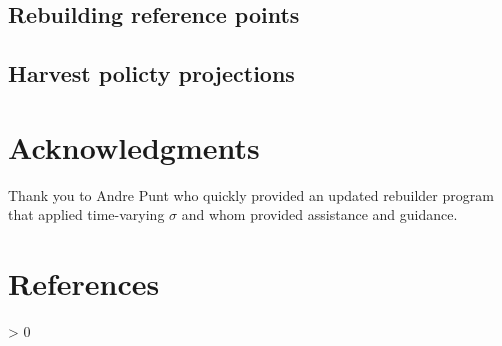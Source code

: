 \documentclass[11pt,
  english,
  a4paper,
]{article}
\newlength{\cslhangindent}
\newenvironment{CSLReferences}[2] %
 {%
  \setlength{\parindent}{0pt}
  \ifodd #1 \everypar{\setlength{\hangindent}{\cslhangindent}}\ignorespaces\fi
  \ifnum #2 > 0
  \setlength{\parskip}{#2\baselineskip}
  \fi
 }%
 {}
\begin{document}
\leavevmode\tagmcend\tagstructend


\hypertarget{rebuilding-reference-points}{%
\subsection{Rebuilding reference points}\label{rebuilding-reference-points}}

\leavevmode\tagmcend\tagstructend


\hypertarget{harvest-policty-projections}{%
\subsection{Harvest policty projections}\label{harvest-policty-projections}}

\leavevmode\tagmcend\tagstructend


\hypertarget{acknowledgments}{%
\section{Acknowledgments}\label{acknowledgments}}

\leavevmode\tagmcend\tagstructend


Thank you to Andre Punt who quickly provided an updated rebuilder program that applied time-varying {\(\sigma\)\leavevmode\tagmcend\tagstructend} and whom provided assistance and guidance.

\leavevmode\tagmcend\tagstructend\par

\clearpage


\hypertarget{references}{%
\section{References}\label{references}}

\leavevmode\tagmcend\tagstructend


\hypertarget{refs}{}
\begin{CSLReferences}{0}{0}
\end{CSLReferences}
\end{document}
